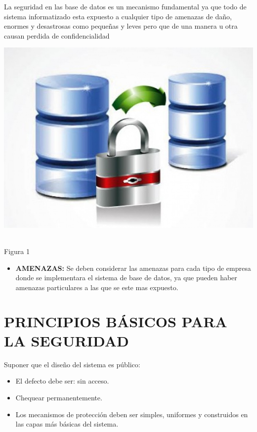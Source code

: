 \documentclass[conference]{IEEEtran}
\begin{document}
La seguridad en las base de datos es un mecanismo fundamental ya que todo de sistema informatizado esta expuesto a cualquier tipo de amenazas de daño, enormes y desastrosas como pequeñas y leves pero que de una manera u otra causan perdida de confidencialidad
\\
\begin{flushright}
  \includegraphics[scale=0.31]{Imagenes/seguridadbd.jpg}
\end{flushright}
\centering
\\Figura 1
\\

\begin{itemize}
\item \textbf{AMENAZAS:} Se deben considerar las amenazas para cada tipo de empresa donde se implementara el sistema de base de datos, ya que pueden haber amenazas particulares a las que se este mas expuesto.
\end{itemize}

\section{PRINCIPIOS BÁSICOS PARA LA SEGURIDAD}

Suponer que el diseño del sistema es público:
\begin{itemize}
\item \textbf{} El defecto debe ser: sin acceso.
\item \textbf{} Chequear permanentemente.
\item \textbf{} Los mecanismos de protección deben ser simples, uniformes y construidos en las capas más básicas del sistema.
\end{itemize}
\end{document}
